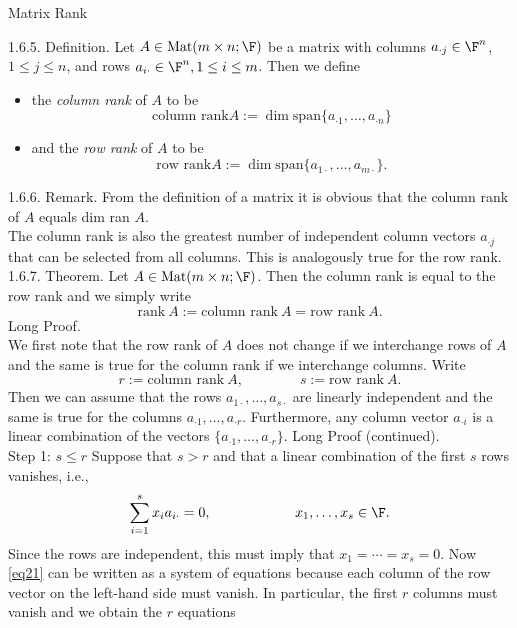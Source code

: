 \documentclass[smaller,hyperref={CJKbookmarks=true}]{beamer}
\begin{document}
\begin{frame}{Matrix Rank}
\begin{spacing}{1}
\alert{1.6.5. Definition.} Let $A\in\text{Mat}(m\times n;\F)$ be a matrix with columns $a_{\cdot j}\in\F^n$,\\$1\leq j\leq n$, and rows $a_{i\cdot}\in\F^n,1\leq i\leq m$. Then we define
\begin{itemize}
  \item the \emph{column rank} of $A$ to be
      \[\text{column rank}A:=\dim\text{span}\{a_{\cdot 1},\ldots,a_{\cdot n}\}\]
  \item and the \emph{row rank} of $A$ to be
      \[\text{row rank}A:=\dim\text{span}\{a_{1\cdot},\ldots,a_{m\cdot}\}.\]
\end{itemize}
\alert{1.6.6. Remark.} From the definition of a matrix it is obvious that the column rank of $A$ equals dim ran $A$.\\[8pt]
The column rank is also the greatest number of independent column
vectors $a_{\cdot j}$ that can be selected from all columns. This is analogously true for the row rank.
\newpage
\alert{1.6.7. Theorem.} Let $A\in\text{Mat}(m\times n;\F)$. Then the column rank is equal to the row rank and we simply write
\[\text{rank}~A:=\text{column rank}~A=\text{row rank}~A.\]
\alert{Long Proof.}\\[7pt]
We first note that the row rank of $A$ does not change if we interchange
rows of $A$ and the same is true for the column rank if we interchange
columns. Write
\[r:=\text{column rank}~A,\qquad\qquad s:=\text{row rank}~A.\]
Then we can assume that the rows $a_{1\cdot},\ldots,a_{s\cdot}$ are linearly independent and the same is true for the columns $a_{\cdot 1},\ldots,a_{\cdot r}$. Furthermore, any column vector $a_{\cdot i}$ is a linear combination of the vectors $\{a_{\cdot 1},\ldots,a_{\cdot r}\}$.
\newpage
\alert{Long Proof (continued).}\\[7pt]
\alert{Step 1: $s\leq r$} Suppose that $s>r$ and that a linear combination of the first $s$ rows vanishes, i.e.,
\setcounter{equation}{0}
\begin{equation}\label{eq21}
  \sum_{i=1}^{s}x_ia_{i\cdot}=0,\qquad\qquad\qquad x_1,\ldots,x_s\in\F.
\end{equation}
Since the rows are independent, this must imply that $x_1=\cdots=x_s=0$.
Now \eqref{eq21} can be written as a system of equations because each column of the row vector on the left-hand side must vanish. In particular, the first $r$ columns must vanish and we obtain the $r$ equations

\end{spacing}
\end{frame}
\end{document}
